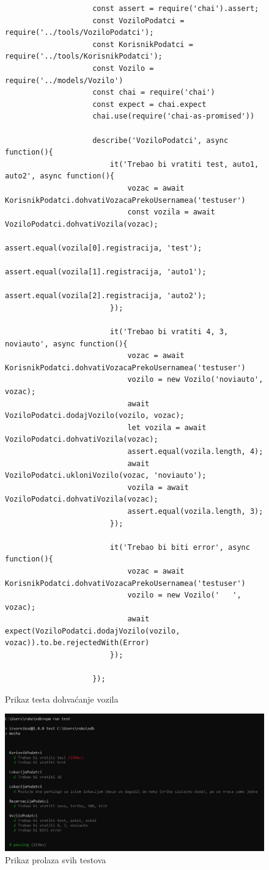 			\begin{figure}[H]
				\begin{lstlisting}
					const assert = require('chai').assert;
					const VoziloPodatci = require('../tools/VoziloPodatci');
					const KorisnikPodatci = require('../tools/KorisnikPodatci');
					const Vozilo = require('../models/Vozilo')
					const chai = require('chai')
					const expect = chai.expect
					chai.use(require('chai-as-promised'))
					
					describe('VoziloPodatci', async function(){
						it('Trebao bi vratiti test, auto1, auto2', async function(){
							vozac = await KorisnikPodatci.dohvatiVozacaPrekoUsernamea('testuser')
							const vozila = await VoziloPodatci.dohvatiVozila(vozac);
							assert.equal(vozila[0].registracija, 'test');
							assert.equal(vozila[1].registracija, 'auto1');
							assert.equal(vozila[2].registracija, 'auto2');
						});
						
						it('Trebao bi vratiti 4, 3, noviauto', async function(){
							vozac = await KorisnikPodatci.dohvatiVozacaPrekoUsernamea('testuser')
							vozilo = new Vozilo('noviauto', vozac);
							await VoziloPodatci.dodajVozilo(vozilo, vozac);
							let vozila = await VoziloPodatci.dohvatiVozila(vozac);
							assert.equal(vozila.length, 4);
							await VoziloPodatci.ukloniVozilo(vozac, 'noviauto');
							vozila = await VoziloPodatci.dohvatiVozila(vozac);
							assert.equal(vozila.length, 3);
						});
						
						it('Trebao bi biti error', async function(){
							vozac = await KorisnikPodatci.dohvatiVozacaPrekoUsernamea('testuser')
							vozilo = new Vozilo('   ', vozac);
							await expect(VoziloPodatci.dodajVozilo(vozilo, vozac)).to.be.rejectedWith(Error)
						});
						
					});
				\end{lstlisting}
				
			
				\centering
				\caption{Prikaz testa dohvaćanje vozila}
				\label{fig:test - user - dohvaćanje vozila}
			\end{figure}
				
			\begin{figure}[H]
				\includegraphics[scale=0.4]{slike/test_unit_testsOK.jpg} %
				\centering
				\caption{Prikaz prolaza svih testova}
				\label{fig:test - user - prolaz svih testova}
			\end{figure}
	
